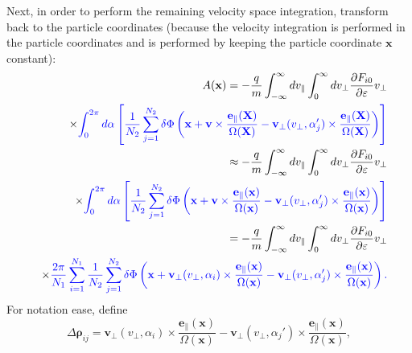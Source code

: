 \documentclass{llncs}
\newcommand{\tmcolor}[2]{{\color{#1}{#2}}}
\begin{document}
Next, in order to perform the remaining velocity space integration, transform
back to the particle coordinates (because the velocity integration is
performed in the particle coordinates and is performed by keeping the particle
coordinate $\mathbf{x}$ constant):
\begin{eqnarray}
  &  & A (\mathbf{x}) = - \frac{q}{m} \int_{- \infty}^{\infty} d
  v_{\parallel} \int_0^{\infty} d v_{\perp} \frac{\partial F_{i 0}}{\partial
  \varepsilon} v_{\perp} \nonumber\\
  &  & \times \tmcolor{blue}{\int_0^{2 \pi} d \alpha \left[ \frac{1}{N_2}
  \sum_{j = 1}^{N_2} \delta \Phi \left( \mathbf{x} +\mathbf{v} \times
  \frac{\mathbf{e}_{\parallel} (\mathbf{X})}{\Omega (\mathbf{X})}
  -\mathbf{v}_{\perp} (v_{\perp}, \alpha_j') \times
  \frac{\mathbf{e}_{\parallel} (\mathbf{X})}{\Omega (\mathbf{X})} \right)
  \right]} \nonumber\\
  &  & \approx - \frac{q}{m} \int_{- \infty}^{\infty} d v_{\parallel}
  \int_0^{\infty} d v_{\perp} \frac{\partial F_{i 0}}{\partial \varepsilon}
  v_{\perp} \nonumber\\
  &  & \times \tmcolor{blue}{\int_0^{2 \pi} d \alpha \left[ \frac{1}{N_2}
  \sum_{j = 1}^{N_2} \delta \Phi \left( \mathbf{x} +\mathbf{v} \times
  \frac{\mathbf{e}_{\parallel} (\mathbf{x})}{\Omega (\mathbf{x})}
  -\mathbf{v}_{\perp} (v_{\perp}, \alpha_j') \times
  \frac{\mathbf{e}_{\parallel} (\mathbf{x})}{\Omega (\mathbf{x})} \right)
  \right]} \nonumber\\
  &  & = - \frac{q}{m}  \int_{- \infty}^{\infty} d v_{\parallel}
  \int_0^{\infty} d v_{\perp} \frac{\partial F_{i 0}}{\partial \varepsilon}
  v_{\perp} \nonumber\\
  &  & \times \tmcolor{blue}{\frac{2 \pi}{N_1} \sum_{i = 1}^{N_1}
  \frac{1}{N_2}  \sum_{j = 1}^{N_2} \delta \Phi \left( \mathbf{x}
  +\mathbf{v}_{\perp} (v_{\perp}, \alpha_i) \times
  \frac{\mathbf{e}_{\parallel} (\mathbf{x})}{\Omega (\mathbf{x})}
  -\mathbf{v}_{\perp} (v_{\perp}, \alpha_j') \times
  \frac{\mathbf{e}_{\parallel} (\mathbf{x})}{\Omega (\mathbf{x})} \right) .} 
  \label{21-9-16-a4}
\end{eqnarray}
For notation ease, define
\begin{equation}
  \Delta \mathbf{\rho}_{i j} =\mathbf{v}_{\perp} (v_{\perp}, \alpha_i) \times
  \frac{\mathbf{e}_{\parallel} (\mathbf{x})}{\Omega (\mathbf{x})}
  -\mathbf{v}_{\perp} (v_{\perp}, \alpha_j') \times
  \frac{\mathbf{e}_{\parallel} (\mathbf{x})}{\Omega (\mathbf{x})},
\end{equation}
\end{document}
